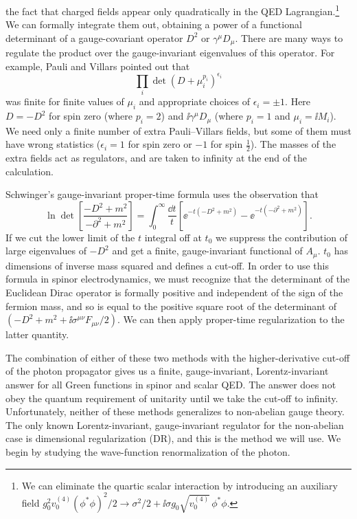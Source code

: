 the fact that charged fields appear only quadratically in the QED Lagrangian.\footnote[12]{We
can eliminate the quartic scalar interaction by introducing an auxiliary field
$g_0^2v_0^{(4)}(\phi^*\phi)^2/2\to\sigma^2/2+\ii\sigma
g_0\sqrt{v_0^{(4)}}\,\phi^*\phi$.} We can
formally integrate them out, obtaining a power of a functional determinant of a
gauge-covariant operator $D^2$ or $\gamma^\mu D_\mu$. There are many ways to
regulate the product over the gauge-invariant eigenvalues of this operator. For
example, Pauli and Villars pointed out that
\[
  \prod_i\det(D+\mu_i^{p_i})^{\epsilon_i}
\]
was finite for finite values of $\mu_i$ and appropriate choices of
$\epsilon_i=\pm1$. Here $D=-D^2$ for spin zero (where $p_i=2$) and
$\ii\gamma^\mu D_\mu$ (where $p_i=1$ and $\mu_i=\ii M_i$). We need only a
finite number of extra Pauli--Villars fields, but some of them must have wrong
statistics ($\epsilon_i=1$ for spin zero or $-1$ for spin $\tfrac12$). The
masses of the extra fields act as regulators, and are taken to infinity at the
end of the calculation.

Schwinger's gauge-invariant proper-time formula uses the observation that
\[
  \ln\det\left[\frac{-D^2+m^2}{-\partial^2+m^2}\right]
  =\int_0^\infty\frac{\dd t}{t}
  \left[\ee^{-t(-D^2+m^2)}-\ee^{-t(-\partial^2+m^2)}\right].
\]
If we cut the lower limit of the $t$ integral off at $t_0$ we suppress the
contribution of large eigenvalues of $-D^2$ and get a finite, gauge-invariant
functional of $A_\mu$. $t_0$ has dimensions of inverse mass squared and defines a
cut-off. In order to use this formula in spinor electrodynamics, we must
recognize that the determinant of the Euclidean Dirac operator is formally
positive and independent of the sign of the fermion mass, and so is equal to the
positive square root of the determinant of
$(-D^2+m^2+\ii\sigma^{\mu\nu}F_{\mu\nu}/2)$. We can then apply proper-time
regularization to the latter quantity.

The combination of either of these two methods with the higher-derivative
cut-off of the photon propagator gives us a finite, gauge-invariant,
Lorentz-invariant answer for all Green functions in spinor and scalar QED. The
answer does not obey the quantum requirement of unitarity until we take the
cut-off to infinity. Unfortunately, neither of these methods generalizes to
non-abelian gauge theory. The only known Lorentz-invariant, gauge-invariant
regulator for the non-abelian case is dimensional regularization (DR), and this
is the method we will use. We begin by studying the wave-function
renormalization of the photon.

